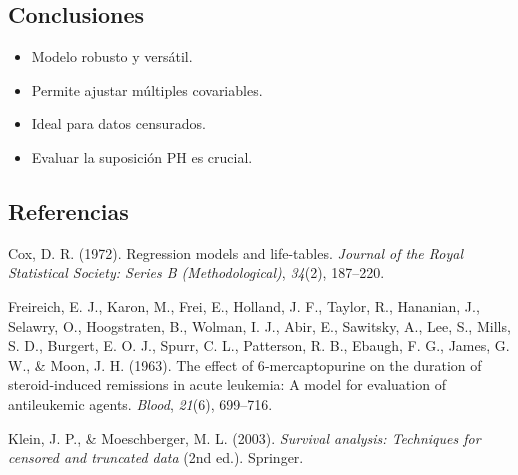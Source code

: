 \documentclass[
]{article}
\providecommand{\tightlist}{%
  \setlength{\itemsep}{0pt}\setlength{\parskip}{0pt}}\usepackage{longtable,booktabs,array}
\newlength{\cslhangindent}
\newenvironment{CSLReferences}[2] %
 {\begin{list}{}{%
  \setlength{\itemindent}{0pt}
  \setlength{\leftmargin}{0pt}
  \setlength{\parsep}{0pt}
  \ifodd #1
   \setlength{\leftmargin}{\cslhangindent}
   \setlength{\itemindent}{-1\cslhangindent}
  \fi
  \setlength{\itemsep}{#2\baselineskip}}}
 {\end{list}}
\begin{document}
\subsection{Conclusiones}\label{conclusiones}

\begin{itemize}
\tightlist
\item
  Modelo robusto y versátil.
\item
  Permite ajustar múltiples covariables.
\item
  Ideal para datos censurados.
\item
  Evaluar la suposición PH es crucial.
\end{itemize}

\subsection{Referencias}\label{referencias}

\label{refs}
\begin{CSLReferences}{1}{0}
Cox, D. R. (1972). Regression models and life-tables. \emph{Journal of
the Royal Statistical Society: Series B (Methodological)}, \emph{34}(2),
187--220.

Freireich, E. J., Karon, M., Frei, E., Holland, J. F., Taylor, R.,
Hananian, J., Selawry, O., Hoogstraten, B., Wolman, I. J., Abir, E.,
Sawitsky, A., Lee, S., Mills, S. D., Burgert, E. O. J., Spurr, C. L.,
Patterson, R. B., Ebaugh, F. G., James, G. W., \& Moon, J. H. (1963).
The effect of 6‑mercaptopurine on the duration of steroid‑induced
remissions in acute leukemia: A model for evaluation of antileukemic
agents. \emph{Blood}, \emph{21}(6), 699--716.

Klein, J. P., \& Moeschberger, M. L. (2003). \emph{Survival analysis:
Techniques for censored and truncated data} (2nd ed.). Springer.

\end{CSLReferences}
\end{document}
